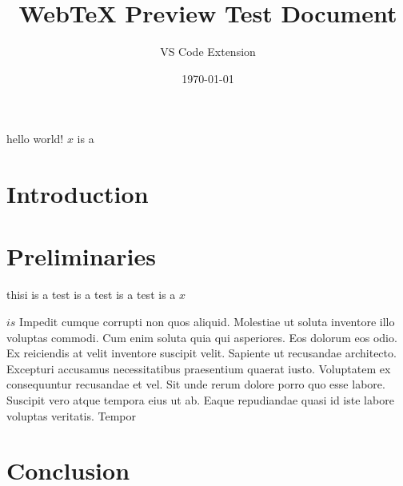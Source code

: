 \documentclass{article}
\title{WebTeX Preview Test Document}
\author{VS Code Extension}
\date{\today}
\begin{document}
\maketitle

hello world! $x$  is  a 

\section{Introduction}

\section{Preliminaries}

\begin{prooftree}
\end{prooftree}

thisi is a test is a test is a test is  a $x$

$ is $
Impedit cumque corrupti non quos aliquid. Molestiae ut soluta inventore illo voluptas commodi. Cum enim soluta quia qui asperiores. Eos dolorum eos odio. Ex reiciendis at velit inventore suscipit velit. Sapiente ut recusandae architecto. Excepturi accusamus necessitatibus praesentium quaerat iusto. Voluptatem ex consequuntur recusandae et vel. Sit unde rerum dolore porro quo esse labore. Suscipit vero atque tempora eius ut ab. Eaque repudiandae quasi id iste labore voluptas veritatis. Tempor
\section{Conclusion}
\end{document}
